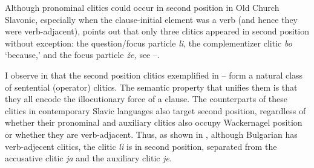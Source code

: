 \documentclass[output=paper,
modfonts,
newtxmath,
hidelinks
]{langscibook}
\begin{document}
\ea \label{ex8}
	\label{ex8a}
	\label{ex8b}
	\z
\z
Although pronominal clitics could occur in second position in Old Church Slavonic, especially when the clause-initial element was a verb (and hence they were verb-adjacent), \citet{radanovickocic1988} points out that only three clitics appeared in second position without exception: the question/focus particle \textit{li}, the complementizer clitic \textit{bo} ‘because,’ and the focus particle \textit{že,} see --. 

\ea \label{ex9}
	\label{ex9a}
	\label{ex9b}
	\label{ex9c}
	\z
\z
I observe in \citet{migdalski2016} that the second position clitics exemplified in -- form a natural class of sentential (operator) clitics. The semantic property that unifies them is that they all encode the illocutionary force of a clause. The counterparts of these clitics in contemporary Slavic languages also target second position, regardless of whether their pronominal and auxiliary clitics also occupy Wackernagel position or whether they are verb-adjacent. Thus, as shown in , although Bulgarian has verb-adjecent clitics, the clitic \textit{li} is in second position, separated from the accusative clitic \textit{ja} and the auxiliary clitic \textit{je}.
\end{document}
